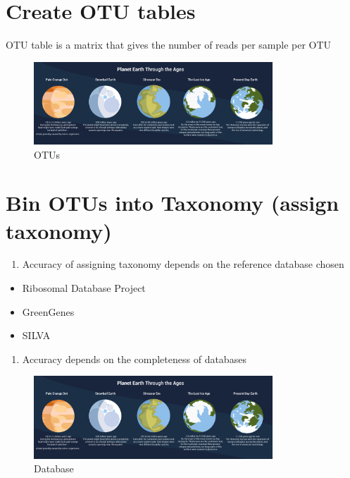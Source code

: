 \documentclass[
]{book}
\providecommand{\tightlist}{%
  \setlength{\itemsep}{0pt}\setlength{\parskip}{0pt}}
\begin{document}
\hypertarget{create-otu-tables}{%
\section{Create OTU tables}\label{create-otu-tables}}

OTU table is a matrix that gives the number of reads per sample per OTU

\begin{figure}
\centering
\includegraphics[width=0.8\textwidth,height=\textheight]{./Figures/Planets.png}
\caption{OTUs}
\end{figure}

\hypertarget{bin-otus-into-taxonomy-assign-taxonomy}{%
\section{Bin OTUs into Taxonomy (assign taxonomy)}\label{bin-otus-into-taxonomy-assign-taxonomy}}

\begin{enumerate}
\def\labelenumi{\arabic{enumi}.}
\tightlist
\item
  Accuracy of assigning taxonomy depends on the
  reference database chosen
\end{enumerate}

\begin{itemize}
\tightlist
\item
  Ribosomal Database Project
\item
  GreenGenes
\item
  SILVA
\end{itemize}

\begin{enumerate}
\def\labelenumi{\arabic{enumi}.}
\setcounter{enumi}{1}
\tightlist
\item
  Accuracy depends on the completeness of databases
\end{enumerate}

\begin{figure}
\centering
\includegraphics[width=0.8\textwidth,height=\textheight]{./Figures/Planets.png}
\caption{Database}
\end{figure}
\end{document}
